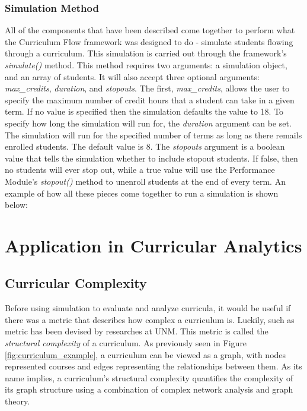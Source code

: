 \documentclass[botnum, fleqn]{unmeethesis}
\begin{document}
  
  \subsection{Simulation Method}
  All of the components that have been described come together to perform what the Curriculum Flow framework was designed to do - simulate students flowing through a curriculum. This simulation is carried out through the framework's \textit{simulate()} method. This method requires two arguments: a simulation object, and an array of students. It will also accept three optional arguments: \textit{max\_credits}, \textit{duration}, and \textit{stopouts}. The first, \textit{max\_credits}, allows the user to specify the maximum number of credit hours that a student can take in a given term. If no value is specified then the simulation defaults the value to 18. To specify how long the simulation will run for, the \textit{duration} argument can be set. The simulation will run for the specified number of terms as long as there remails enrolled students. The default value is 8. The \textit{stopouts} argument is a boolean value that tells the simulation whether to include stopout students. If false, then no students will ever stop out, while a true value will use the Performance Module's \textit{stopout()} method to unenroll students at the end of every term. An example of how all these pieces come together to run a simulation is shown below:

  


\chapter{Application in Curricular Analytics}

\section{Curricular Complexity}

Before using simulation to evaluate and analyze curricula, it would be useful if there was a metric that describes how complex a curriculum is. Luckily, such as metric has been devised by researches at UNM. This metric is called the \textit{structural complexity} of a curriculum. As previously seen in Figure \ref{fig:curriculum_example}, a curriculum can be viewed as a graph, with nodes represented courses and edges representing the relationships between them. As its name implies, a curriculum's structural complexity quantifies the complexity of its graph structure using a combination of complex network analysis and graph theory. 
\end{document}
